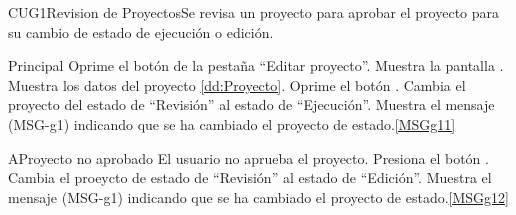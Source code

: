 
\begin{UseCase}{CUG1}{Revision de Proyectos}{Se revisa un proyecto para aprobar el proyecto para su cambio de estado de ejecución o edición.}
\end{UseCase}
	
	
\begin{UCtrayectoria}{Principal}
		\UCpaso[\UCactor] Oprime el botón  de la pestaña ``Editar proyecto''.
		\UCpaso Muestra la pantalla .
		\UCpaso Muestra los datos del proyecto \ref{dd:Proyecto}.
		\UCpaso[\UCactor] Oprime el botón . 
		\UCpaso Cambia el proyecto del estado de ``Revisión'' al estado de ``Ejecución''.
		\UCpaso Muestra el mensaje (MSG-g1) indicando que se ha cambiado el proyecto de estado.\ref{MSGg11}
\end{UCtrayectoria}

\begin{UCtrayectoriaA}{A}{Proyecto no aprobado }{El usuario no aprueba el proyecto.}
			\UCpaso[\UCactor] Presiona el botón .
			\UCpaso Cambia el proeycto de estado de ``Revisión'' al estado de ``Edición''.
			\UCpaso Muestra el mensaje (MSG-g1) indicando que se ha cambiado el proyecto de estado.\ref{MSGg12}
\end{UCtrayectoriaA}


